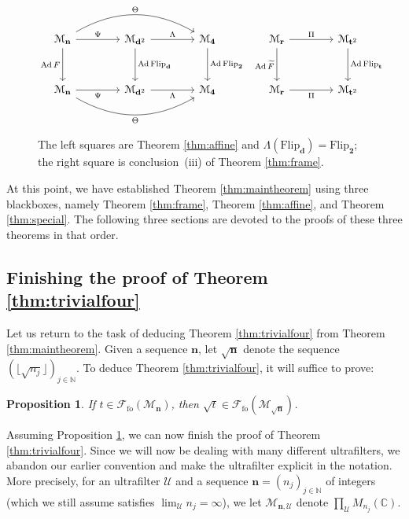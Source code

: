 \documentclass[12pt]{amsart}
\numberwithin{equation}{section}
\newtheorem{prop}[thm]{Proposition}
\theoremstyle{definition}
\newcommand{\C}{\mathbb{C}}
\newcommand{\N}{\mathbb{N}}
\def\cal{\mathcal}
\def\M{\mathcal{M}}
\newcommand{\Flip}{\mathrm{Flip}}
\newcommand{\bseq}[1]{\mathbf{#1}}
\DeclareMathOperator{\Ad}{Ad}
\newcommand\cU{{\cal U}}
\def \M{\mathcal{M}}
\begin{document}
\begin{figure}[tbp]
\centering
\[
\begin{tikzcd}[column sep=4em, row sep=3em]
\M_{\bseq n}
  \arrow[r,"\Psi"] \arrow[d,"\Ad F"']
  \arrow[rr, bend left=30, "\Theta"]
& \M_{\bseq d^2}
  \arrow[r,"\Lambda"] \arrow[d,"\Ad\Flip_{\bseq d}"]
& \M_{\bseq 4}
  \arrow[d,"\Ad\Flip_{\bseq 2}"]
& \M_{\bseq r}
  \arrow[r,"\Pi"] \arrow[d,"\Ad\widetilde F"']
& \M_{\bseq t^2}
  \arrow[d,"\Ad\Flip_{\bseq t}"]
\\
\M_{\bseq n}
  \arrow[r,"\Psi"']
  \arrow[rr, bend right=30, "\Theta"']
& \M_{\bseq d^2}
  \arrow[r,"\Lambda"']
& \M_{\bseq 4}
& \M_{\bseq r}
  \arrow[r,"\Pi"']
& \M_{\bseq t^2}
\end{tikzcd}
\]
\caption{The left squares are Theorem \ref{thm:affine} and $\Lambda(\mathrm{Flip}_{\mathbf d})=\mathrm{Flip}_{\mathbf 2}$;
the right square is conclusion~(iii) of Theorem \ref{thm:frame}.}
\label{fig:thm26-flips}
\end{figure}

At this point, we have established Theorem \ref{thm:maintheorem} using three blackboxes, namely Theorem \ref{thm:frame}, Theorem \ref{thm:affine}, and Theorem \ref{thm:special}.  The following three sections are devoted to the proofs of these three theorems in that order.

\subsection{Finishing the proof of Theorem \ref{thm:trivialfour}}
Let us return to the task of deducing Theorem \ref{thm:trivialfour} from Theorem \ref{thm:maintheorem}.  Given a sequence $\mathbf{n}$, let $\sqrt{\mathbf{n}}$ denote the sequence $(\lfloor \sqrt{n_j}\rfloor)_{j\in \N}$.  To deduce Theorem \ref{thm:trivialfour}, it will suffice to prove:

\begin{prop}\label{prop:sqrt}
If $t\in \mathcal{F}_{\operatorname{fo}}(\M_{\mathbf{n}})$, then $\sqrt{t}\in \mathcal{F}_{\operatorname{fo}}(\M_{\sqrt{\mathbf{n}}})$.
\end{prop}

Assuming Proposition \ref{prop:sqrt}, we can now finish the proof of Theorem \ref{thm:trivialfour}.  Since we will now be dealing with many different ultrafilters, we abandon our earlier convention and make the ultrafilter explicit in the notation.  More precisely, for an ultrafilter $\cU$ and a sequence $\mathbf{n}=(n_j)_{j\in \N}$ of integers (which we still assume satisfies $\lim_\cU n_j=\infty$), we let $\M_{\mathbf{n},\cU}$ denote $\prod_\cU M_{n_j}(\C)$. 
\end{document}
